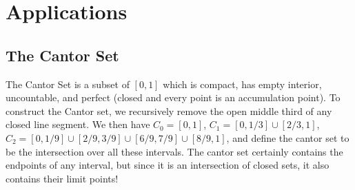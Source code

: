 \documentclass[11pt, a4paper]{memoir}
\theoremstyle{change}
\theoremstyle{plain}
\theoremstyle{nonumberplain}
\numberwithin{equation}{section}
\begin{document}
\section{Applications}
\subsection{The Cantor Set}\label{cantor}
The Cantor Set is a subset of $[0,1]$ which is compact, has empty interior, uncountable, and perfect (closed and every point
is an accumulation point). To construct the Cantor set, we recursively remove the open middle third of any closed line segment.
We then have $C_0=[0,1]$, $C_1=[0,1/3]\cup[2/3,1]$, $C_2=[0,1/9]\cup[2/9,3/9]\cup[6/9,7/9]\cup[8/9,1]$, and define the cantor
set to be the intersection over all these intervals. The cantor set certainly contains the endpoints of any interval, but
since it is an intersection of closed sets, it also contains their limit points!
\end{document}
